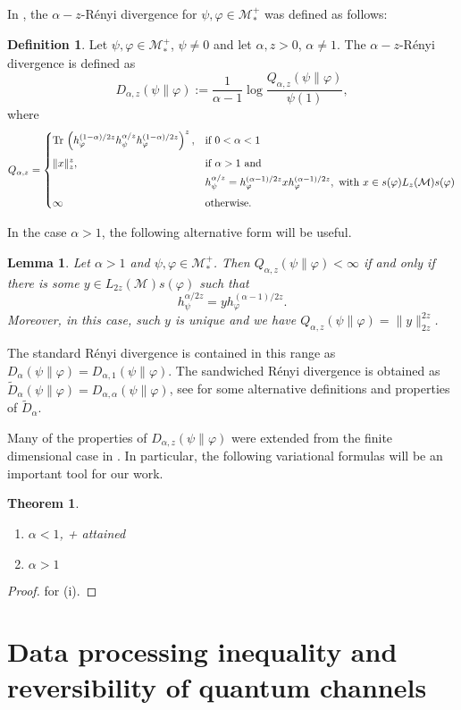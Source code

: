 \documentclass[12pt]{article}
\newtheorem{lemma}{Lemma}
\newtheorem{theorem}{Theorem}
\theoremstyle{definition}
\newtheorem{defi}{Definition}
\theoremstyle{remark}
\def\Me{\mathcal M}
\def \Tr{\mathrm{Tr}\,}
\begin{document}
In \cite{kato2023aremark, kato2023onrenyi}, the
$\alpha-z$-R\'enyi divergence for $\psi,\varphi\in \mathcal M_*^+$  was defined as
follows: 
\begin{defi}\label{defi:renyi} Let $\psi,\varphi\in \Me_*^+$, $\psi\ne 0$ and let
$\alpha,z>0$, $\alpha\ne 1$. The $\alpha-z$-R\'enyi divergence is defined as 
\[
D_{\alpha,z}(\psi\|\varphi):=\frac1{\alpha-1}\log
\frac{Q_{\alpha,z}(\psi\|\varphi)}{\psi(1)},
\]
where 
\[
Q_{\alpha,z}=\begin{dcases} \Tr
\left(h_\varphi^{(1-\alpha)/2z}h_\psi^{\alpha/z}h_\varphi^{(1-\alpha)/2z}\right)^z, &
\text{if } 0<\alpha<1\\[0.3em]
\|x\|_z^z, & \text{if } \alpha>1 \text{ and }\\
\ & h_\psi^{\alpha/z}=h_\varphi^{(\alpha-1)/2z}xh_\varphi^{(\alpha-1)/2z},\text{ with }
x\in s(\varphi)L_z(\Me)s(\varphi)\\[0.3em]
\infty& \text{otherwise}.
\end{dcases}
\]
\end{defi}


In the case $\alpha>1$, the following alternative form will be useful.

\begin{lemma}\cite{kato2023onrenyi} \label{lemma:renyi_2z}
Let $\alpha>1$ and $\psi,\varphi\in \Me_*^+$. Then $Q_{\alpha,z}(\psi\|\varphi)<\infty$ if
and only if there is some $y\in L_{2z}(\Me)s(\varphi)$ such that 
\[
h_\psi^{\alpha/2z}=yh_\varphi^{(\alpha-1)/2z}.
\]
Moreover, in this case, such $y$ is unique and we have
$Q_{\alpha,z}(\psi\|\varphi)=\|y\|_{2z}^{2z}$. 
\end{lemma}

The standard R\'enyi divergence \cite{petz1985quasi, hiai2018quantum, hiai2021quantum} is
contained in this range as $D_\alpha(\psi\|\varphi)=D_{\alpha,1}(\psi\|\varphi)$. The
sandwiched R\'enyi divergence  is obtained as $\tilde
D_\alpha(\psi\|\varphi)=D_{\alpha,\alpha}(\psi\|\varphi)$, see
\cite{berta2018renyi,hiai2021quantum,jencova2018renyi, jencova2021renyi} for some
alternative definitions and properties of $\tilde D_\alpha$. 



Many of the  properties of $D_{\alpha,z}(\psi\|\varphi)$ 
were extended from the finite dimensional case in \cite{kato2023onrenyi}. In particular, the following variational formulas will be an important tool for our work.

\begin{theorem}\label{thm:variational}
\begin{enumerate}
\item[(i)] $\alpha<1$, + attained
\item[(ii)] $\alpha>1$

\end{enumerate}


\end{theorem}


\begin{proof} \cite{kato2023onrenyi} for (i).


\end{proof}

\section{Data processing inequality and reversibility of quantum channels}
\end{document}
